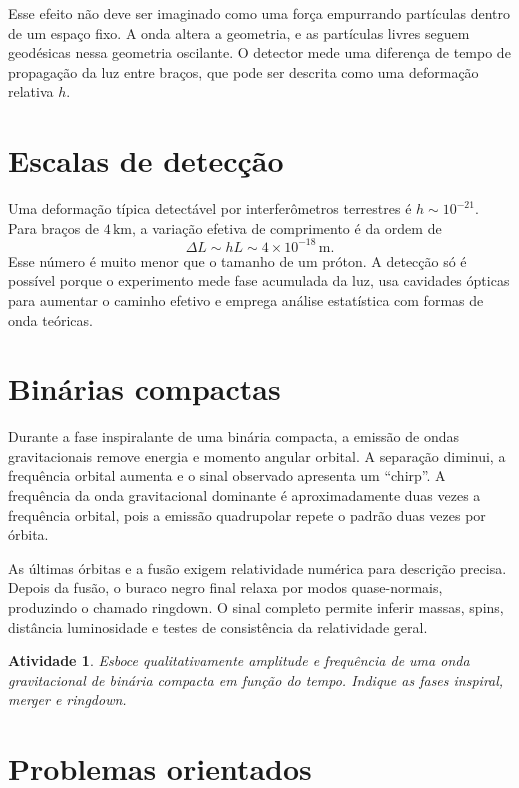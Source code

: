 \documentclass[12pt,a4paper,oneside]{book}
\theoremstyle{rgplain}
\newtheorem{activity}{Atividade}[chapter]
\theoremstyle{rgremark}
\begin{document}
Esse efeito não deve ser imaginado como uma força empurrando partículas dentro
de um espaço fixo. A onda altera a geometria, e as partículas livres seguem
geodésicas nessa geometria oscilante. O detector mede uma diferença de tempo de
propagação da luz entre braços, que pode ser descrita como uma deformação
relativa $h$.

\section{Escalas de detecção}

Uma deformação típica detectável por interferômetros terrestres é
$h\sim10^{-21}$. Para braços de $4\,\mathrm{km}$, a variação efetiva de
comprimento é da ordem de
\[
  \Delta L\sim hL\sim 4\times10^{-18}\,\mathrm{m}.
\]
Esse número é muito menor que o tamanho de um próton. A detecção só é possível
porque o experimento mede fase acumulada da luz, usa cavidades ópticas para
aumentar o caminho efetivo e emprega análise estatística com formas de onda
teóricas.

\section{Binárias compactas}

Durante a fase inspiralante de uma binária compacta, a emissão de ondas
gravitacionais remove energia e momento angular orbital. A separação diminui,
a frequência orbital aumenta e o sinal observado apresenta um ``chirp''. A
frequência da onda gravitacional dominante é aproximadamente duas vezes a
frequência orbital, pois a emissão quadrupolar repete o padrão duas vezes por
órbita.

As últimas órbitas e a fusão exigem relatividade numérica para descrição
precisa. Depois da fusão, o buraco negro final relaxa por modos quase-normais,
produzindo o chamado ringdown. O sinal completo permite inferir massas, spins,
distância luminosidade e testes de consistência da relatividade geral.

\begin{activity}
Esboce qualitativamente amplitude e frequência de uma onda gravitacional de
binária compacta em função do tempo. Indique as fases inspiral, merger e
ringdown.
\end{activity}

\section{Problemas orientados}
\end{document}
